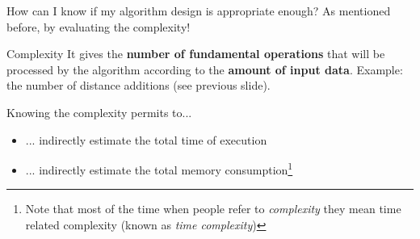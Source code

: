 \documentclass{beamer}[10pt, usepdftitle=false, handout]
\begin{document}
	\begin{frame}	
	
	\begin{block}{How can I know if my algorithm design is appropriate enough?}
	As mentioned before, by evaluating the complexity!
	\end{block}
	
	\pause
	
	\begin{exampleblock}{Complexity}
	It gives the \textbf{number of fundamental operations} that will be processed by the algorithm according to the \textbf{amount of input data}. Example: the number of distance additions (see previous slide).
	\end{exampleblock}
	
	\pause
	
	Knowing the complexity permits to...
		
	\begin{itemize}
	\item {... indirectly estimate the total time of execution}
	\item {... indirectly estimate the total memory consumption\footnote{Note that most of the time when people refer to \textit{complexity} they mean time related complexity (known as \textit{time complexity})}}
	\end{itemize}		
		
		
	\end{frame}
	
	
\end{document}
